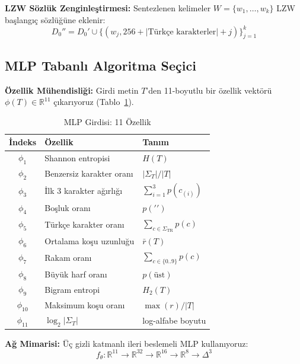 \documentclass[conference]{IEEEtran}
\begin{document}
\noindent\textbf{LZW Sözlük Zenginleştirmesi:} Sentezlenen kelimeler \(W = \{w_1, \ldots, w_k\}\) LZW başlangıç sözlüğüne eklenir:
\begin{equation}
D_0'' = D_0' \cup \{(w_j, 256 + |\text{Türkçe karakterler}| + j)\}_{j=1}^{k}
\label{eq:llm_dict}
\end{equation}

\subsection{MLP Tabanlı Algoritma Seçici}

\noindent\textbf{Özellik Mühendisliği:} Girdi metin \(T\)'den 11-boyutlu bir özellik vektörü \(\phi(T) \in \mathbb{R}^{11}\) çıkarıyoruz (Tablo~\ref{tab:features}).

\begin{table}[h]
\caption{MLP Girdisi: 11 Özellik}
\label{tab:features}
\centering
\small
\begin{tabular}{@{}cll@{}}
\toprule
İndeks & Özellik & Tanım \\
\midrule
\(\phi_1\) & Shannon entropisi & \(H(T)\) \\
\(\phi_2\) & Benzersiz karakter oranı & \(|\Sigma_T|/|T|\) \\
\(\phi_3\) & İlk 3 karakter ağırlığı & \(\sum_{i=1}^{3} p(c_{(i)})\) \\
\(\phi_4\) & Boşluk oranı & \(p(' ')\) \\
\(\phi_5\) & Türkçe karakter oranı & \(\sum_{c \in \Sigma_{\text{TR}}} p(c)\) \\
\(\phi_6\) & Ortalama koşu uzunluğu & \(\bar{r}(T)\) \\
\(\phi_7\) & Rakam oranı & \(\sum_{c \in \{0..9\}} p(c)\) \\
\(\phi_8\) & Büyük harf oranı & \(p(\text{üst})\) \\
\(\phi_9\) & Bigram entropi & \(H_2(T)\) \\
\(\phi_{10}\) & Maksimum koşu oranı & \(\max(r)/|T|\) \\
\(\phi_{11}\) & \(\log_2 |\Sigma_T|\) & log-alfabe boyutu \\
\bottomrule
\end{tabular}
\end{table}

\noindent\textbf{Ağ Mimarisi:} Üç gizli katmanlı ileri beslemeli MLP kullanıyoruz:
\begin{equation}
f_\theta : \mathbb{R}^{11} \to \mathbb{R}^{32} \to \mathbb{R}^{16} \to \mathbb{R}^{8} \to \Delta^{3}
\label{eq:mlp_arch}
\end{equation}
\end{document}
